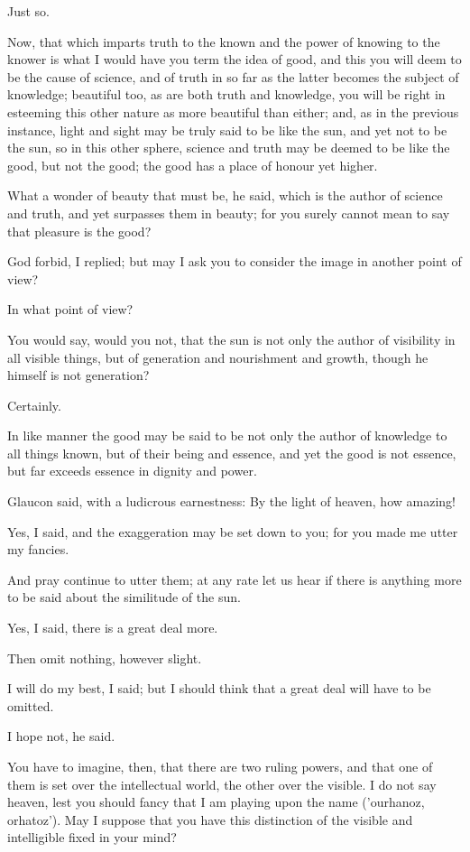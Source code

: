 Just so.

Now, that which imparts truth to the known and the power of knowing to
the knower is what I would have you term the idea of good, and this
you will deem to be the cause of science, and of truth in so far as
the latter becomes the subject of knowledge; beautiful too, as are both
truth and knowledge, you will be right in esteeming this other nature as
more beautiful than either; and, as in the previous instance, light and
sight may be truly said to be like the sun, and yet not to be the sun,
so in this other sphere, science and truth may be deemed to be like the
good, but not the good; the good has a place of honour yet higher.

What a wonder of beauty that must be, he said, which is the author of
science and truth, and yet surpasses them in beauty; for you surely
cannot mean to say that pleasure is the good?

God forbid, I replied; but may I ask you to consider the image in
another point of view?

In what point of view?

You would say, would you not, that the sun is not only the author of
visibility in all visible things, but of generation and nourishment and
growth, though he himself is not generation?

Certainly.

In like manner the good may be said to be not only the author of
knowledge to all things known, but of their being and essence, and yet
the good is not essence, but far exceeds essence in dignity and power.

Glaucon said, with a ludicrous earnestness: By the light of heaven, how
amazing!

Yes, I said, and the exaggeration may be set down to you; for you made
me utter my fancies.

And pray continue to utter them; at any rate let us hear if there is
anything more to be said about the similitude of the sun.

Yes, I said, there is a great deal more.

Then omit nothing, however slight.

I will do my best, I said; but I should think that a great deal will
have to be omitted.

I hope not, he said.

You have to imagine, then, that there are two ruling powers, and that
one of them is set over the intellectual world, the other over the
visible. I do not say heaven, lest you should fancy that I am playing
upon the name ('ourhanoz, orhatoz'). May I suppose that you have this
distinction of the visible and intelligible fixed in your mind?

